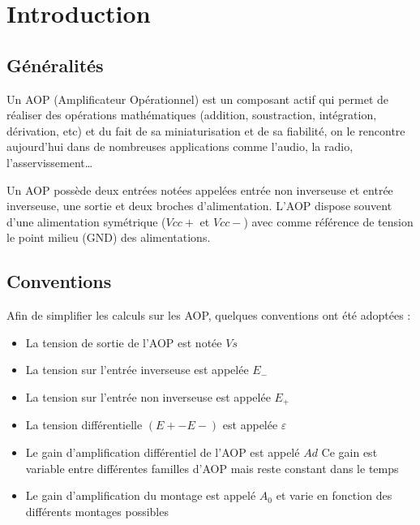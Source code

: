 
 \chapter{Introduction}
  \section{Généralités}

Un AOP (Amplificateur Opérationnel) est un composant actif qui permet de réaliser des opérations mathématiques (addition, soustraction, intégration, dérivation, etc) et du fait de sa miniaturisation et de sa fiabilité, on le rencontre aujourd’hui dans de nombreuses applications comme l’audio, la radio, l’asservissement…


Un AOP possède deux entrées notées appelées {\color{red}entrée non inverseuse} et {\color{red}entrée inverseuse}, une {\color{red}sortie} et deux broches d’{\color{red}alimentation}.
L’AOP dispose souvent d’une alimentation symétrique ($Vcc+$ et $Vcc-$) avec comme référence de tension le point milieu (GND) des alimentations.



\section{Conventions}


Afin de simplifier les calculs sur les AOP, quelques conventions ont été adoptées :

\begin{itemize}
  \item La tension de sortie de l’AOP est notée $Vs$
  \item La tension sur l’entrée inverseuse est appelée $E_-$
  \item La tension sur l’entrée non inverseuse est appelée $E_+$
  \item La tension différentielle {\color{red}$(E+-E-)$ est appelée $\varepsilon$}
  \item Le gain d’amplification différentiel de l’AOP est appelé $Ad$
  Ce gain est variable entre différentes familles d’AOP mais reste constant dans le temps
  \item Le gain d’amplification du montage est appelé $A_0$ et varie en fonction des différents montages possibles 
\end{itemize}

